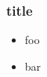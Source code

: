 \documentclass{beamer}
\begin{document}
	
\begin{frame}
\frametitle{title}
\transfly[direction=180]
\pause
\begin{itemize}[<+->]
\item foo
\item bar
\end{itemize}
\end{frame}	
	
\end{document}
